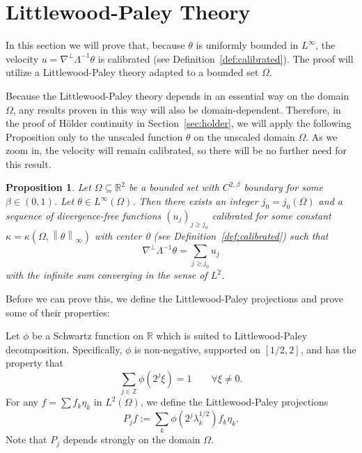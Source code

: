 \documentclass[11pt]{amsart}
\newtheorem{proposition}[theorem]{Proposition}
\theoremstyle{remark}
\theoremstyle{definition}
\newcommand{\R}{\mathbb{R}}
\newcommand{\Z}{\mathbb{Z}}
\newcommand{\norm}[1]{\left\lVert#1\right\rVert}
\newcommand{\grad}{\nabla}
\newcommand{\eigen}[1]{\eta_{#1}} %
\newcommand{\Ccalib}{\kappa}
\begin{document}
\vskip1cm
\section{Littlewood-Paley Theory} \label{sec:littlewood paley}

In this section we will prove that, because $\theta$ is uniformly bounded in $L^\infty$, the velocity $u = \grad^\perp \Lambda^{-1} \theta$ is calibrated (see Definition~\ref{def:calibrated}).  The proof will utilize a Littlewood-Paley theory adapted to a bounded set $\Omega$.  

Because the Littlewood-Paley theory depends in an essential way on the domain $\Omega$, any results proven in this way will also be domain-dependent.  Therefore, in the proof of H\"{o}lder continuity in Section~\ref{sec:holder}, we will apply the following Proposition only to the unscaled function $\theta$ on the unscaled domain $\Omega$.  As we zoom in, the velocity will remain calibrated, so there will be no further need for this result.  

\begin{proposition} \label{thm:u is calibrated}
Let $\Omega \subseteq \R^2$ be a bounded set with $C^{2,\beta}$ boundary for some $\beta \in (0,1)$.  Let $\theta \in L^\infty(\Omega)$.  Then there exists an integer $j_0 = j_0(\Omega)$ and a sequence of divergence-free functions $(u_j)_{j \geq j_0}$ calibrated for some constant $\Ccalib = \Ccalib(\Omega, \norm{\theta}_\infty)$ with center 0 (see Definition~\ref{def:calibrated}) such that
\[ \grad^\perp \Lambda^{-1} \theta = \sum_{j \geq j_0} u_j \]
with the infinite sum converging in the sense of $L^2$.  
\end{proposition}

Before we can prove this, we define the Littlewood-Paley projections and prove some of their properties:

Let $\phi$ be a Schwartz function on $\R$ which is suited to Littlewood-Paley decomposition.  Specifically, $\phi$ is non-negative, supported on $[1/2,2]$, and has the property that
\[ \sum_{j \in \Z} \phi(2^j \xi) = 1 \qquad \forall \xi \neq 0. \]
For any $f = \sum f_k \eigen{k}$ in $L^2(\Omega)$, we define the Littlewood-Paley projections
\[ P_j f := \sum_k \phi(2^j \lambda_k^{1/2}) f_k \eigen{k}. \]
Note that $P_j$ depends strongly on the domain $\Omega$.  
\end{document}
